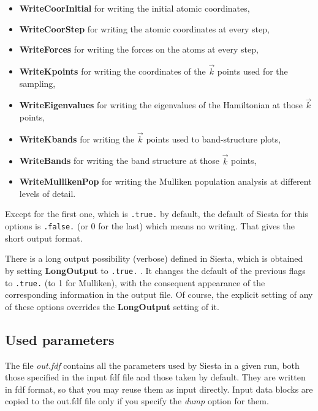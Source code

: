 \documentclass[11pt]{article}
\begin{document}
\begin{itemize}
\item
{\bf WriteCoorInitial}
for writing the initial atomic coordinates,
\item
{\bf WriteCoorStep}
for writing the atomic coordinates at every step,
\item
{\bf WriteForces}
for writing the forces on the atoms at every step,
\item
{\bf WriteKpoints}
for writing the coordinates of the $\vec k$ points used for the sampling,
\item
{\bf WriteEigenvalues}
for writing the eigenvalues of the Hamiltonian at those $\vec k$ points,
\item
{\bf WriteKbands}
for writing the $\vec k$ points used to band-structure plots,
\item
{\bf WriteBands}
for writing the band structure at those $\vec k$ points,
\item
{\bf WriteMullikenPop}
for writing the Mulliken population analysis at different levels of detail.
\end{itemize}

Except for the first one, which is {\tt .true.} by default, the
default of {\sc Siesta} for this options is {\tt .false.} (or 0 for the last)
which means no writing. That gives the short output format.

There is a long output possibility (verbose) defined in {\sc Siesta}, which is
obtained by setting {\bf LongOutput} to {\tt .true.} . It changes 
the default of the previous flags to {\tt .true.} (to 1 for 
Mulliken), with the consequent appearance of the 
corresponding information in the output file.
Of course, the explicit setting of any of these options overrides the
{\bf LongOutput} setting of it.



\subsection{Used parameters}
The file {\it out.fdf} contains all the parameters used by {\sc Siesta}
in a given run, both those specified in the input fdf file and
those taken by default. They are written in fdf format, so that
you may reuse them as input directly. Input data blocks are 
copied to the out.fdf file only if you specify the {\it dump} option
for them.
\end{document}
